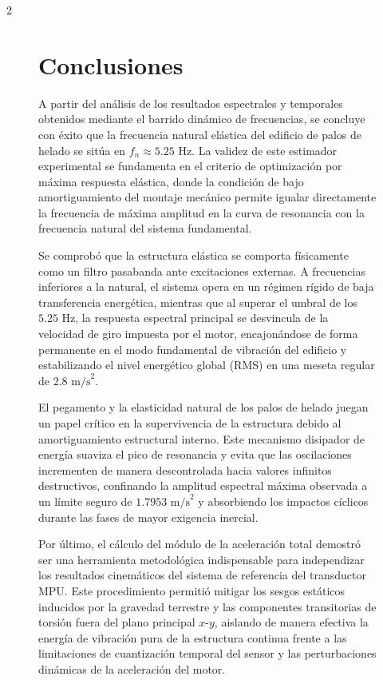 \documentclass[10pt]{article}
\begin{document}
\begin{multicols}{2}
\begin{figure}[ht]
\section{Conclusiones}


A partir del análisis de los resultados espectrales y temporales obtenidos mediante el barrido dinámico de frecuencias, se concluye con éxito que la frecuencia natural elástica del edificio de palos de helado se sitúa en $f_n \approx 5.25\text{ Hz}$. La validez de este estimador experimental se fundamenta en el criterio de optimización por máxima respuesta elástica, donde la condición de bajo amortiguamiento del montaje mecánico permite igualar directamente la frecuencia de máxima amplitud en la curva de resonancia con la frecuencia natural del sistema fundamental.

Se comprobó que la estructura elástica se comporta físicamente como un filtro pasabanda ante excitaciones externas. A frecuencias inferiores a la natural, el sistema opera en un régimen rígido de baja transferencia energética, mientras que al superar el umbral de los $5.25\text{ Hz}$, la respuesta espectral principal se desvincula de la velocidad de giro impuesta por el motor, encajonándose de forma permanente en el modo fundamental de vibración del edificio y estabilizando el nivel energético global (RMS) en una meseta regular de $2.8\text{ m/s}^2$.

El pegamento y la elasticidad natural de los palos de helado juegan un papel crítico en la supervivencia de la estructura debido al amortiguamiento estructural interno. Este mecanismo disipador de energía suaviza el pico de resonancia y evita que las oscilaciones incrementen de manera descontrolada hacia valores infinitos destructivos, confinando la amplitud espectral máxima observada a un límite seguro de $1.7953\text{ m/s}^2$ y absorbiendo los impactos cíclicos durante las fases de mayor exigencia inercial.

Por último, el cálculo del módulo de la aceleración total demostró ser una herramienta metodológica indispensable para independizar los resultados cinemáticos del sistema de referencia del transductor MPU. Este procedimiento permitió mitigar los sesgos estáticos inducidos por la gravedad terrestre y las componentes transitorias de torsión fuera del plano principal $x$-$y$, aislando de manera efectiva la energía de vibración pura de la estructura continua frente a las limitaciones de cuantización temporal del sensor y las perturbaciones dinámicas de la aceleración del motor.


\end{figure}
\end{multicols}
\end{document}
